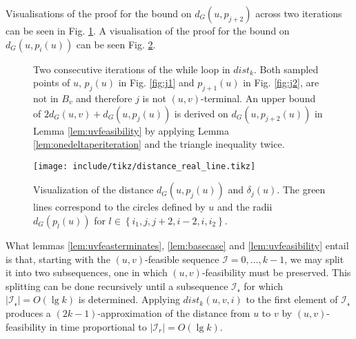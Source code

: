 \documentclass[12pt]{article}
\begin{document}
Visualisations of the proof for the bound on $d_G(u,p_{j+2})$ across two iterations can be seen in Fig. \ref{fig:twoiterations}. A visualisation of the proof for the bound on $d_G(u,p_i(u))$ can be seen Fig. \ref{fig:realline}.

\begin{figure}[!hbt]
  \centering
  \hfill
  \caption{Two consecutive iterations of the while loop in $dist_k$. Both sampled points of $u$, $p_j(u)$ in Fig. \ref{fig:j1} and $p_{j+1}(u)$ in Fig. \ref{fig:j2}, are not in $B_v$ and therefore $j$ is not $(u,v)$-terminal. An upper bound of $2d_{G}(u,v)+d_G(u,p_j(u))$ is derived on $d_G(u,p_{j+2}(u))$ in Lemma \ref{lem:uvfeasibility} by applying Lemma \ref{lem:onedeltaperiteration} and the triangle inequality twice. \label{fig:twoiterations}}
\end{figure}

\begin{figure}
\centering
    \texttt{[image: include/tikz/distance\_real\_line.tikz]}%
\caption{Visualization of the distance $d_G(u,p_j(u))$ and $\delta_j(u)$. The green lines correspond to the circles defined by $u$ and the radii $d_G(p_l(u))$ for $l \in \left\{ i_1, j, j+2, i-2, i, i_2 \right\}$. \label{fig:realline}}
\end{figure}

What lemmas \ref{lem:uvfeasterminates}, \ref{lem:basecase} and \ref{lem:uvfeasibility} entail is that, starting with the $(u,v)$-feasible sequence $\mathcal{I}=0,\hdots,k-1$, we may split it into two subsequences, one in which $(u,v)$-feasibility must be preserved. This splitting can be done recursively until a subsequence $\mathcal{I_r}$ for which $|\mathcal{I_r}|=O(\lg k)$ is determined. Applying $dist_k(u,v,i)$ to the first element of $\mathcal{I_r}$ produces a $(2k-1)$-approximation of the distance from $u$ to $v$ by $(u,v)$-feasibility in time proportional to $|\mathcal{I}_r|=O(\lg k)$.
\end{document}
